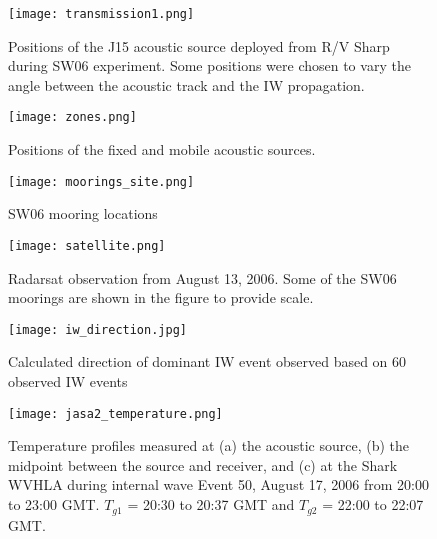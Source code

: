 



\clearpage

\begin{figure}[H]
\centering
  \texttt{[image: transmission1.png]}
  \caption{Positions of the J15 acoustic source deployed from R/V Sharp during SW06 experiment. Some positions were chosen to vary the angle between the acoustic track and the IW propagation.}
  \label{fig:transmission}
\end{figure}


\begin{figure}[H]
  \centering
  \texttt{[image: zones.png]}
  \caption{Positions of the fixed and mobile acoustic sources.}\label{fig:zones}
\end{figure}


\begin{figure}[H]
\centering
  \texttt{[image: moorings\_site.png]}\\
  \caption{SW06 mooring locations}
  \label{fig:moorings}
\end{figure}



\begin{figure}[H]
\centering
  \texttt{[image: satellite.png]}\\
  \caption{Radarsat observation from August 13, 2006. Some of the SW06
moorings are shown in the figure to provide scale.}
  \label{fig:satellite}
\end{figure}


\begin{figure}[H]
\centering
  \texttt{[image: iw\_direction.jpg]}\\
  \caption{Calculated direction of dominant IW event observed based on 60 observed IW events}
  \label{fig:IW_dir}
\end{figure}

\begin{figure}
  \centering
  \texttt{[image: jasa2\_temperature.png]}
  \caption{Temperature profiles measured at (a) the acoustic source, (b) the midpoint between the source and receiver, and (c) at the Shark WVHLA during internal wave Event 50, August 17, 2006 from 20:00 to 23:00 GMT. $T_{g1}$ = 20:30 to 20:37 GMT and $T_{g2}$ = 22:00 to 22:07 GMT.}\label{fig:temp}
\end{figure}

